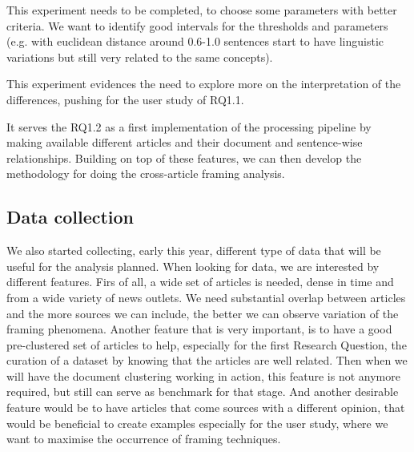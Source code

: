 This experiment needs to be completed, to choose some parameters with better criteria. We want to identify good intervals for the thresholds and parameters (e.g. with euclidean distance around 0.6-1.0 sentences start to have linguistic variations but still very related to the same concepts).

This experiment evidences the need to explore more on the interpretation of the differences, pushing for the user study of RQ1.1.

It serves the RQ1.2 as a first implementation of the processing pipeline by making available different articles and their document and sentence-wise relationships. Building on top of these features, we can then develop the methodology for doing the cross-article framing analysis.




\subsection{Data collection}
We also started collecting, early this year, different type of data that will be useful for the analysis planned.
When looking for data, we are interested by different features.
Firs of all, a wide set of articles is needed, dense in time and from a wide variety of news outlets. We need substantial overlap between articles and the more sources we can include, the better we can observe variation of the framing phenomena.
Another feature that is very important, is to have a good pre-clustered set of articles to help, especially for the first Research Question, the curation of a dataset by knowing that the articles are well related. Then when we will have the document clustering working in action, this feature is not anymore required, but still can serve as benchmark for that stage.
And another desirable feature would be to have articles that come sources with a different opinion, that would be beneficial to create examples especially for the user study, where we want to maximise the occurrence of framing techniques. 

